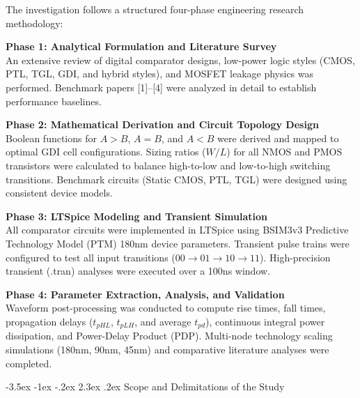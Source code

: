 \documentclass[12pt,a4paper,oneside]{report}
\makeatletter
\renewcommand\section{\@startsection {section}{1}{\z@}%
                                   {-3.5ex \@plus -1ex \@minus -.2ex}%
                                   {2.3ex \@plus.2ex}%
                                   {\normalfont\normalsize\bfseries}}
\makeatother
\begin{document}
The investigation follows a structured four-phase engineering research methodology:

\noindent\textbf{Phase 1: Analytical Formulation and Literature Survey}\\
An extensive review of digital comparator designs, low-power logic styles (CMOS, PTL, TGL, GDI, and hybrid styles), and MOSFET leakage physics was performed. Benchmark papers [1]--[4] were analyzed in detail to establish performance baselines.

\noindent\textbf{Phase 2: Mathematical Derivation and Circuit Topology Design}\\
Boolean functions for $A>B$, $A=B$, and $A<B$ were derived and mapped to optimal GDI cell configurations. Sizing ratios ($W/L$) for all NMOS and PMOS transistors were calculated to balance high-to-low and low-to-high switching transitions. Benchmark circuits (Static CMOS, PTL, TGL) were designed using consistent device models.

\noindent\textbf{Phase 3: LTSpice Modeling and Transient Simulation}\\
All comparator circuits were implemented in LTSpice using BSIM3v3 Predictive Technology Model (PTM) 180nm device parameters. Transient pulse trains were configured to test all input transitions ($00 \rightarrow 01 \rightarrow 10 \rightarrow 11$). High-precision transient (.tran) analyses were executed over a 100ns window.

\noindent\textbf{Phase 4: Parameter Extraction, Analysis, and Validation}\\
Waveform post-processing was conducted to compute rise times, fall times, propagation delays ($t_{pHL}$, $t_{pLH}$, and average $t_{pd}$), continuous integral power dissipation, and Power-Delay Product (PDP). Multi-node technology scaling simulations (180nm, 90nm, 45nm) and comparative literature analyses were completed.

\section{Scope and Delimitations of the Study}
\end{document}

